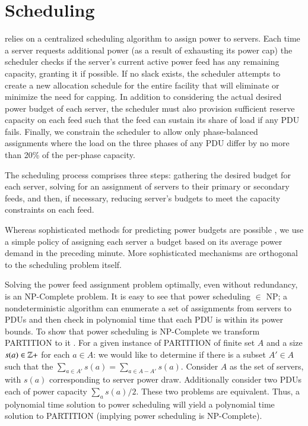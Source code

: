 \section{Scheduling}
\label{section::scheduling}

\PowerRouting relies on a centralized scheduling algorithm to assign power to servers. Each time a server requests additional power (as a result of exhausting its power cap) the scheduler checks if the server's current active power feed has any remaining capacity, granting it if possible. If no slack exists, the scheduler attempts to create a new allocation schedule for the entire facility that will eliminate or minimize the need for capping. In addition to considering the actual desired power budget of each server, the scheduler must also provision sufficient reserve capacity on each feed such that the feed can sustain its share of load if any PDU fails.  Finally, we constrain the scheduler to allow only phase-balanced assignments where the load on the three phases of any PDU differ by no more than 20\% of the per-phase capacity.

The scheduling process comprises three steps: gathering the desired budget for each server, solving for an assignment of servers to their primary or secondary feeds, and then, if necessary, reducing server's budgets to meet the capacity constraints on each feed.

Whereas sophisticated methods for predicting power budgets are possible \cite{Choi08}, we use a simple policy of assigning each server a budget based on its average power demand in the preceding minute.  More sophisticated mechanisms are orthogonal to the scheduling problem itself.

Solving the power feed assignment problem optimally, even without redundancy, is an NP-Complete problem.  It is easy to see that power scheduling $\in$ NP; a nondeterministic algorithm can enumerate a set of assignments from servers to PDUs and then check in polynomial time that each PDU is within its power bounds.  To show that power scheduling is NP-Complete we transform PARTITION to it \cite{GareyBook}.  For a given instance of PARTITION of finite set $A$ and a size $s(a) \in \mathbb{Z+}$ for each $a \in A$: we would like to determine if there is a subset $A' \in A$ such that the $\sum_{a \in A'}{s(a)} = \sum_{a \in A-A'}{s(a)}$. Consider $A$ as the set of servers, with $s(a)$ corresponding to server power draw. Additionally consider two PDUs each of power capacity $\sum_{a} s(a) / 2$. These two problems are equivalent. Thus, a polynomial time solution to power scheduling will yield a polynomial time solution to PARTITION (implying power scheduling is NP-Complete).


